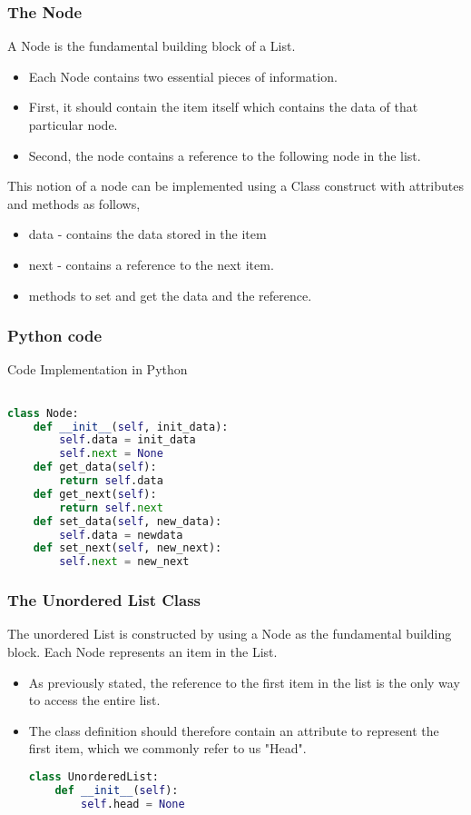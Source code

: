 \documentclass{beamer}
\begin{document}
\begin{frame}
\frametitle{The Node}
A Node is the fundamental building block of a List.
\begin{itemize}

\item Each Node contains two essential pieces of information.

\item First, it should contain the item itself which contains the data of that particular node.

\item Second, the node contains a reference to the following node in the list.

\end{itemize}
This notion of a node can be implemented using a Class construct with attributes and methods as follows, 

\begin{itemize}
\item data - contains the data stored in the item
\item next - contains a reference to the next item.
\item methods to set and get the data and the reference.
\end{itemize}
\end{frame}

\begin{frame}[fragile]
\frametitle{Python code}

Code Implementation in Python
\begin{lstlisting}[language=Python]

class Node:
	def __init__(self, init_data):
		self.data = init_data
		self.next = None
	def get_data(self):
		return self.data
	def get_next(self):
		return self.next
	def set_data(self, new_data):
		self.data = newdata
	def set_next(self, new_next):
		self.next = new_next
\end{lstlisting}

\end{frame}

\begin{frame}[fragile]
\frametitle{The Unordered List Class}
The unordered List is constructed by using a Node as the fundamental building block. Each Node represents an item in the List.

\begin{itemize}

\item As previously stated, the reference to the first item in the list is the only way to access the entire list.

\item The class definition should therefore contain an attribute to represent the first item, which we commonly refer to us "Head".

\begin{lstlisting}[language=Python]
class UnorderedList:
	def __init__(self):
		self.head = None
\end{lstlisting}
\end{itemize}
\end{frame}
\end{document}
